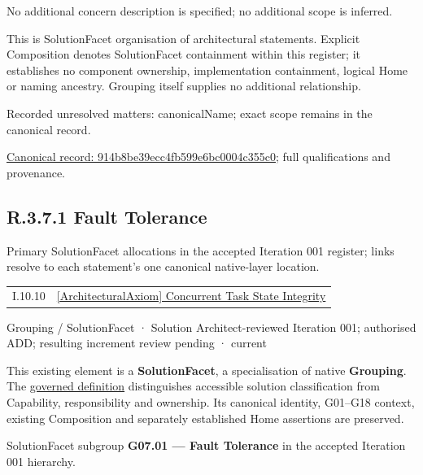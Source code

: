 No additional concern description is specified; no additional scope is inferred.



This is SolutionFacet organisation of architectural statements. Explicit Composition denotes SolutionFacet containment within this register; it establishes no component ownership, implementation containment, logical Home or naming ancestry. Grouping itself supplies no additional relationship.


{\small Recorded unresolved matters: canonicalName; exact scope remains in the canonical record.}\par
{\footnotesize \href{../../../../../../../continuum/grouping/914b8be39ecc4fb599e6bc0004c355c0.md}{Canonical record: 914b8be39ecc4fb599e6bc0004c355c0}; full qualifications and provenance.}\par
\subsection*{R.3.7.1 Fault Tolerance}
\label{navigation:R.3.7.1}

Primary SolutionFacet allocations in the accepted Iteration 001 register; links resolve to each statement’s one canonical native-layer location.\par
\begin{longtable}{p{.22\linewidth}p{.73\linewidth}}
I.10.10 & \hyperref[element:26f3759e1d014a7cae5f265ea6530000]{[ArchitecturalAxiom] Concurrent Task State Integrity} \\
\end{longtable}
\label{element:0a59e0ebb33c494e939148d30e42f49c}
{\small Grouping / SolutionFacet · Solution Architect-reviewed Iteration 001; authorised ADD; resulting increment review pending · current}\par

This existing element is a \textbf{SolutionFacet}, a specialisation of native
\textbf{Grouping}. The \href{\detokenize{../../../../../../../governance/continuum-representation.md#solutionfacet-classification--1119-candidate}}{governed definition}
distinguishes accessible solution classification from Capability, responsibility
and ownership. Its canonical identity, G01–G18 context, existing Composition
and separately established Home assertions are preserved.



SolutionFacet subgroup \textbf{G07.01 — Fault Tolerance} in the accepted Iteration 001 hierarchy.



